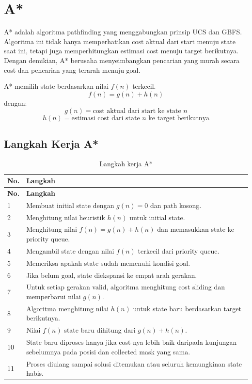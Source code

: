 \section{A*}

A* adalah algoritma pathfinding yang menggabungkan prinsip UCS dan GBFS. 
Algoritma ini tidak hanya memperhatikan cost aktual dari start menuju state saat ini, tetapi juga memperhitungkan estimasi cost menuju target berikutnya. 
Dengan demikian, A* berusaha menyeimbangkan pencarian yang murah secara cost dan pencarian yang terarah menuju goal.

\begin{tcolorbox}[
	colback=red!5,
	colframe=red!60!black,
	title=\textbf{Prinsip A*},
	arc=2mm,
	boxrule=0.8pt
]
A* memilih state berdasarkan nilai $f(n)$ terkecil.
\[
	f(n) = g(n) + h(n)
\]
dengan:
\[
	g(n) = \text{cost aktual dari start ke state } n
\]
\[
	h(n) = \text{estimasi cost dari state } n \text{ ke target berikutnya}
\]
\end{tcolorbox}

\subsection{Langkah Kerja A*}

\begin{longtable}{|p{1.2cm}|p{12.8cm}|}
	\caption{Langkah kerja A*} \\
	\hline
	\rowcolor{red!15}
	\textbf{No.} & \textbf{Langkah} \\
	\hline
	\endfirsthead
	
	\hline
	\rowcolor{red!15}
	\textbf{No.} & \textbf{Langkah} \\
	\hline
	\endhead
	
	1 & Membuat initial state dengan $g(n)=0$ dan path kosong. \\
	\hline
	2 & Menghitung nilai heuristik $h(n)$ untuk initial state. \\
	\hline
	3 & Menghitung nilai $f(n)=g(n)+h(n)$ dan memasukkan state ke priority queue. \\
	\hline
	4 & Mengambil state dengan nilai $f(n)$ terkecil dari priority queue. \\
	\hline
	5 & Memeriksa apakah state sudah memenuhi kondisi goal. \\
	\hline
	6 & Jika belum goal, state diekspansi ke empat arah gerakan. \\
	\hline
	7 & Untuk setiap gerakan valid, algoritma menghitung cost sliding dan memperbarui nilai $g(n)$. \\
	\hline
	8 & Algoritma menghitung nilai $h(n)$ untuk state baru berdasarkan target berikutnya. \\
	\hline
	9 & Nilai $f(n)$ state baru dihitung dari $g(n)+h(n)$. \\
	\hline
	10 & State baru diproses hanya jika cost-nya lebih baik daripada kunjungan sebelumnya pada posisi dan collected mask yang sama. \\
	\hline
	11 & Proses diulang sampai solusi ditemukan atau seluruh kemungkinan state habis. \\
	\hline
\end{longtable}


